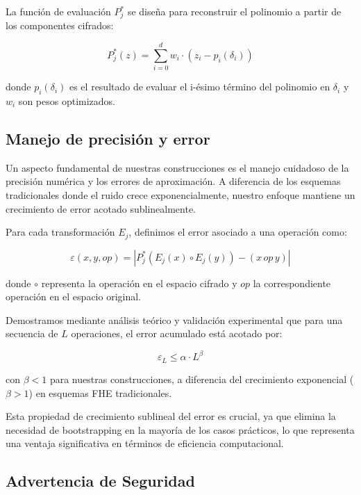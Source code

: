 \documentclass[11pt]{article}
\theoremstyle{plain}
\begin{document}
La funci\'on de evaluaci\'on $P^*_j$ se dise\~na para reconstruir el polinomio a partir de los componentes cifrados:

\begin{equation}
P^*_j(z) = \sum_{i=0}^d w_i \cdot (z_i - p_i(\delta_i))
\end{equation}

donde $p_i(\delta_i)$ es el resultado de evaluar el i-\'esimo t\'ermino del polinomio en $\delta_i$ y $w_i$ son pesos optimizados.

\subsection{Manejo de precisi\'on y error}

Un aspecto fundamental de nuestras construcciones es el manejo cuidadoso de la precisi\'on num\'erica y los errores de aproximaci\'on. A diferencia de los esquemas tradicionales donde el ruido crece exponencialmente, nuestro enfoque mantiene un crecimiento de error acotado sublinealmente.

Para cada transformaci\'on $E_j$, definimos el error asociado a una operaci\'on como:

\begin{equation}
\varepsilon(x, y, op) = |P^*_j(E_j(x) \circ E_j(y)) - (x \,op\, y)|
\end{equation}

donde $\circ$ representa la operaci\'on en el espacio cifrado y $op$ la correspondiente operaci\'on en el espacio original.

Demostramos mediante an\'alisis te\'orico y validaci\'on experimental que para una secuencia de $L$ operaciones, el error acumulado est\'a acotado por:

\begin{equation}
\varepsilon_L \leq \alpha \cdot L^\beta
\end{equation}

con $\beta < 1$ para nuestras construcciones, a diferencia del crecimiento exponencial ($\beta > 1$) en esquemas FHE tradicionales.

Esta propiedad de crecimiento sublineal del error es crucial, ya que elimina la necesidad de bootstrapping en la mayor\'ia de los casos pr\'acticos, lo que representa una ventaja significativa en t\'erminos de eficiencia computacional.

\subsection{Advertencia de Seguridad}
\end{document}
